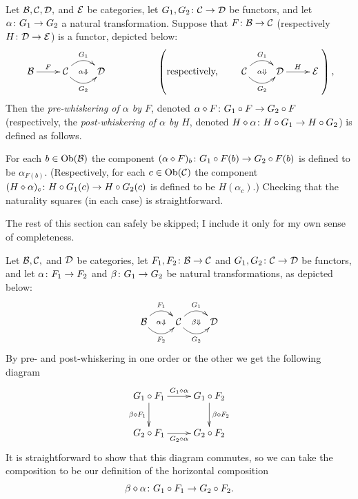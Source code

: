\documentclass[../main/CT4S-EN-RU]{subfiles}
\begin{document}
\begin{definitionENG}[Whiskering]\label{def:whiskering}
Let $\mathcal{B},\mathcal{C},\mathcal{D},$ and $\mathcal{E}$ be categories, let $G_1,G_2\colon\mathcal{C}\rightarrow\mathcal{D}$ be functors, and let $\alpha\colon G_1\rightarrow G_2$ a natural transformation. Suppose that $F\colon\mathcal{B}\rightarrow\mathcal{C}$ (respectively $H\colon\mathcal{D}\rightarrow\mathcal{E}$) is a functor, depicted below:
$$
\xymatrix{\mcB\ar[r]^F&\mcC\ar@{}[r]|{\alpha\Down}\ar@/^1pc/[r]^{G_1}\ar@/_1pc/[r]_{G_2}&\mcD}
\hspace{.7in}
\left(\tn{respectively,}\hsp\xymatrix{\mcC\ar@{}[r]|{\alpha\Down}\ar@/^1pc/[r]^{G_1}\ar@/_1pc/[r]_{G_2}&\mcD\ar[r]^H&\mcE}\right),
$$
Then the {\em pre-whiskering of $\alpha$ by $F$}, denoted $\alpha\diamond F\colon G_1\circ F\rightarrow G_2\circ F$ (respectively, the {\em post-whiskering of $\alpha$ by $H$}, denoted $H\diamond\alpha\colon H\circ G_1\rightarrow H\circ G_2$) is defined as follows.

For each $b\in\operatorname{Ob}(\mathcal{B})$ the component $(\alpha\diamond F)_b\colon G_1\circ F(b)\rightarrow G_2\circ F(b)$ is defined to be $\alpha_{F(b)}.$ (Respectively, for each $c\in\operatorname{Ob}(\mathcal{C})$ the component $(H\diamond\alpha)_c\colon H\circ G_1(c)\rightarrow H\circ G_2(c)$ is defined to be $H(\alpha_c).$) Checking that the naturality squares (in each case) is straightforward.
\end{definitionENG}

\begin{definitionRUS}[Whiskering]\label{def:whiskering}
\end{definitionRUS}

\begin{blockENG}
The rest of this section can safely be skipped; I include it only for my own sense of completeness.
\end{blockENG}

\begin{blockRUS}
\end{blockRUS}

\begin{definitionENG}\label{def:horizontal comp of nt}
Let $\mathcal{B},\mathcal{C},$ and $\mathcal{D}$ be categories, let $F_1,F_2\colon\mathcal{B}\rightarrow\mathcal{C}$ and $G_1,G_2\colon\mathcal{C}\rightarrow\mathcal{D}$ be functors, and let $\alpha\colon F_1\rightarrow F_2$ and $\beta\colon G_1\rightarrow G_2$ be natural transformations, as depicted below:
$$
\xymatrix{\mcB\ar@{}[r]|{\alpha\Down}\ar@/^1pc/[r]^{F_1}\ar@/_1pc/[r]_{F_2}&\mcC\ar@{}[r]|{\beta\Down}\ar@/^1pc/[r]^{G_1}\ar@/_1pc/[r]_{G_2}&\mcD}
$$
By pre- and post-whiskering in one order or the other we get the following diagram
$$
\xymatrix{
G_1\circ F_1\ar[r]^{G_1\diamond\alpha}\ar[d]_{\beta\diamond F_1}&G_1\circ F_2\ar[d]^{\beta\diamond F_2}\\
G_2\circ F_1\ar[r]_{G_2\diamond\alpha}&G_2\circ F_2}
$$
It is straightforward to show that this diagram commutes, so we can take the composition to be our definition of the horizontal composition 
$$\beta\diamond\alpha\colon G_1\circ F_1\rightarrow G_2\circ F_2.$$
\end{definitionENG}
\end{document}
